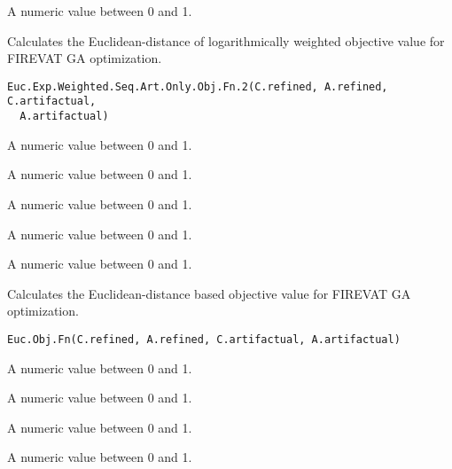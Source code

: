 \documentclass[letterpaper]{book}
\begin{document}
%
\begin{Value}
A numeric value between 0 and 1.
\end{Value}
%
\begin{Description}\relax
Calculates the Euclidean-distance of logarithmically weighted
objective value for FIREVAT GA optimization.
\end{Description}
%
\begin{Usage}
\begin{verbatim}
Euc.Exp.Weighted.Seq.Art.Only.Obj.Fn.2(C.refined, A.refined, C.artifactual,
  A.artifactual)
\end{verbatim}
\end{Usage}
%
\begin{Arguments}
\begin{ldescription}
\item[\code{C.refined}] A numeric value between 0 and 1.

\item[\code{A.refined}] A numeric value between 0 and 1.

\item[\code{C.artifactual}] A numeric value between 0 and 1.

\item[\code{A.artifactual}] A numeric value between 0 and 1.
\end{ldescription}
\end{Arguments}
%
\begin{Value}
A numeric value between 0 and 1.
\end{Value}
%
\begin{Description}\relax
Calculates the Euclidean-distance based objective value for FIREVAT GA optimization.
\end{Description}
%
\begin{Usage}
\begin{verbatim}
Euc.Obj.Fn(C.refined, A.refined, C.artifactual, A.artifactual)
\end{verbatim}
\end{Usage}
%
\begin{Arguments}
\begin{ldescription}
\item[\code{C.refined}] A numeric value between 0 and 1.

\item[\code{A.refined}] A numeric value between 0 and 1.

\item[\code{C.artifactual}] A numeric value between 0 and 1.

\item[\code{A.artifactual}] A numeric value between 0 and 1.
\end{ldescription}
\end{Arguments}
\end{document}
